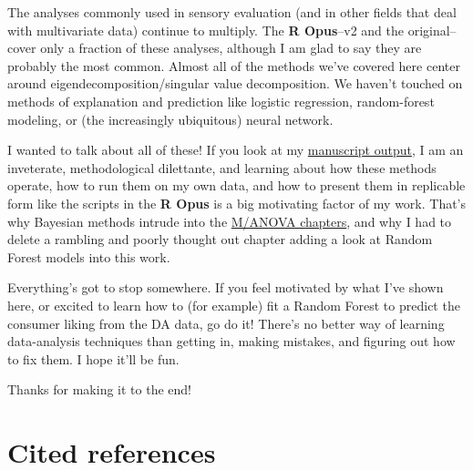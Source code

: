 \documentclass[
]{book}
\begin{document}
The analyses commonly used in sensory evaluation (and in other fields that deal with multivariate data) continue to multiply. The \textbf{R Opus}--v2 and the original--cover only a fraction of these analyses, although I am glad to say they are probably the most common. Almost all of the methods we've covered here center around eigendecomposition/singular value decomposition. We haven't touched on methods of explanation and prediction like logistic regression, random-forest modeling, or (the increasingly ubiquitous) neural network.

I wanted to talk about all of these! If you look at my \href{https://scholar.google.com/citations?user=f-3bd00AAAAJ&hl=en}{manuscript output}, I am an inveterate, methodological dilettante, and learning about how these methods operate, how to run them on my own data, and how to present them in replicable form like the scripts in the \textbf{R Opus} is a big motivating factor of my work. That's why Bayesian methods intrude into the \hyperref[analysis-of-variance]{M/ANOVA chapters}, and why I had to delete a rambling and poorly thought out chapter adding a look at Random Forest models into this work.

Everything's got to stop somewhere. If you feel motivated by what I've shown here, or excited to learn how to (for example) fit a Random Forest to predict the consumer liking from the DA data, go do it! There's no better way of learning data-analysis techniques than getting in, making mistakes, and figuring out how to fix them. I hope it'll be fun.

Thanks for making it to the end!

\section{Cited references}\label{cited-references}

  
\end{document}
